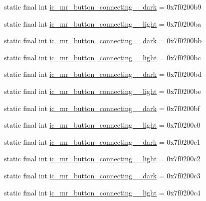 \begin{CompactItemize}
\item 
static final int \hyperlink{classandroid_1_1support_1_1v7_1_1cardview_1_1_r_1_1drawable_0b21513660b72e56dda5d27748e0627a}{ic\_\-mr\_\-button\_\-connecting\_\_\-dark} = 0x7f0200b9
\item 
static final int \hyperlink{classandroid_1_1support_1_1v7_1_1cardview_1_1_r_1_1drawable_54764fad80313537c58dc019db87fd37}{ic\_\-mr\_\-button\_\-connecting\_\_\-light} = 0x7f0200ba
\item 
static final int \hyperlink{classandroid_1_1support_1_1v7_1_1cardview_1_1_r_1_1drawable_af15986fdef2358c98971e0a0df37590}{ic\_\-mr\_\-button\_\-connecting\_\_\-dark} = 0x7f0200bb
\item 
static final int \hyperlink{classandroid_1_1support_1_1v7_1_1cardview_1_1_r_1_1drawable_7c19b1f29109890a6ebc999e94ac5268}{ic\_\-mr\_\-button\_\-connecting\_\_\-light} = 0x7f0200bc
\item 
static final int \hyperlink{classandroid_1_1support_1_1v7_1_1cardview_1_1_r_1_1drawable_32f118621747505a790ebfd440a6ed90}{ic\_\-mr\_\-button\_\-connecting\_\_\-dark} = 0x7f0200bd
\item 
static final int \hyperlink{classandroid_1_1support_1_1v7_1_1cardview_1_1_r_1_1drawable_5bf1cee3a797df97d35bc2e5175e82c2}{ic\_\-mr\_\-button\_\-connecting\_\_\-light} = 0x7f0200be
\item 
static final int \hyperlink{classandroid_1_1support_1_1v7_1_1cardview_1_1_r_1_1drawable_46f1689a968dbf5527912a220b3e514b}{ic\_\-mr\_\-button\_\-connecting\_\_\-dark} = 0x7f0200bf
\item 
static final int \hyperlink{classandroid_1_1support_1_1v7_1_1cardview_1_1_r_1_1drawable_0c75e25a580b1b8941ead7c8b877f136}{ic\_\-mr\_\-button\_\-connecting\_\_\-light} = 0x7f0200c0
\item 
static final int \hyperlink{classandroid_1_1support_1_1v7_1_1cardview_1_1_r_1_1drawable_939011638f6eec511112ece6ba5bffee}{ic\_\-mr\_\-button\_\-connecting\_\_\-dark} = 0x7f0200c1
\item 
static final int \hyperlink{classandroid_1_1support_1_1v7_1_1cardview_1_1_r_1_1drawable_52140cc6ad16da5d0dd1bdb9f2c7ccd1}{ic\_\-mr\_\-button\_\-connecting\_\_\-light} = 0x7f0200c2
\item 
static final int \hyperlink{classandroid_1_1support_1_1v7_1_1cardview_1_1_r_1_1drawable_c13daadbaf363c1c8230285932a5b018}{ic\_\-mr\_\-button\_\-connecting\_\_\-dark} = 0x7f0200c3
\item 
static final int \hyperlink{classandroid_1_1support_1_1v7_1_1cardview_1_1_r_1_1drawable_67ebe54484aa4d1bc86928884213a25c}{ic\_\-mr\_\-button\_\-connecting\_\_\-light} = 0x7f0200c4

\end{CompactItemize}
